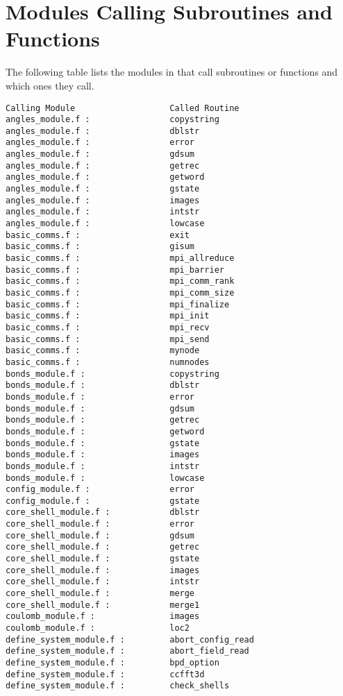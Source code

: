 \section*{Modules Calling Subroutines and Functions}

The following table lists the modules in \D{} that call subroutines or
functions and which ones they call.

\begin{verbatim}
Calling Module                   Called Routine               
angles_module.f :                copystring 
angles_module.f :                dblstr
angles_module.f :                error 
angles_module.f :                gdsum 
angles_module.f :                getrec 
angles_module.f :                getword 
angles_module.f :                gstate 
angles_module.f :                images 
angles_module.f :                intstr
angles_module.f :                lowcase 
basic_comms.f :                  exit 
basic_comms.f :                  gisum 
basic_comms.f :                  mpi_allreduce 
basic_comms.f :                  mpi_barrier 
basic_comms.f :                  mpi_comm_rank 
basic_comms.f :                  mpi_comm_size 
basic_comms.f :                  mpi_finalize 
basic_comms.f :                  mpi_init 
basic_comms.f :                  mpi_recv 
basic_comms.f :                  mpi_send 
basic_comms.f :                  mynode
basic_comms.f :                  numnodes
bonds_module.f :                 copystring 
bonds_module.f :                 dblstr
bonds_module.f :                 error 
bonds_module.f :                 gdsum 
bonds_module.f :                 getrec 
bonds_module.f :                 getword 
bonds_module.f :                 gstate 
bonds_module.f :                 images 
bonds_module.f :                 intstr
bonds_module.f :                 lowcase 
config_module.f :                error 
config_module.f :                gstate 
core_shell_module.f :            dblstr
core_shell_module.f :            error 
core_shell_module.f :            gdsum 
core_shell_module.f :            getrec 
core_shell_module.f :            gstate 
core_shell_module.f :            images 
core_shell_module.f :            intstr
core_shell_module.f :            merge 
core_shell_module.f :            merge1 
coulomb_module.f :               images 
coulomb_module.f :               loc2
define_system_module.f :         abort_config_read 
define_system_module.f :         abort_field_read 
define_system_module.f :         bpd_option 
define_system_module.f :         ccfft3d 
define_system_module.f :         check_shells 

\end{verbatim}
